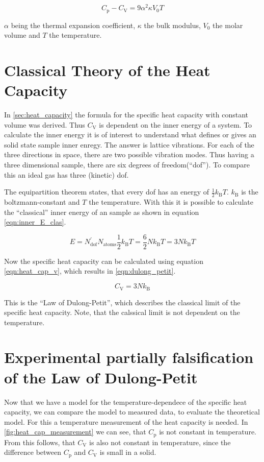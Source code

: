 \begin{equation}
    \label{eqn:p_v_correction}
    C_\mathrm{p} - C_\mathrm{V} = 9\alpha^2\kappa V_0T
\end{equation}

$\alpha$ being the thermal expansion coefficient, $\kappa$ the bulk modulus, $V_0$ the molar volume and $T$ the temperature.

\section{Classical Theory of the Heat Capacity}
\label{sec:classical}
In \autoref{sec:heat_capacity} the formula for the specific heat capacity with constant volume was derived. Thus $C_\mathrm{V}$ is dependent on the inner energy of a system. To 
calculate the inner energy it is of interest to understand what defines or gives an solid state sample inner enregy. The answer is lattice vibrations. For each of the three directions
in space, there are two possible vibration modes. Thus having a three dimensional sample, there are six degrees of freedom(\enquote{dof}). To compare this an ideal gas has three (kinetic)
dof.

The equipartition theorem states, that every
dof has an energy of $\frac{1}{2}k_\mathrm{B}T$. $k_\mathrm{B}$ is the boltzmann-constant and $T$ the temperature. With this it is possible to calculate the \enquote{classical} inner
energy of an sample as shown in equation \ref{eqn:inner_E_clas}.

\begin{equation}
    \label{eqn:inner_E_clas}
    E = N_{\mathrm{dof}}^{'} N_{\mathrm{atoms}} \frac{1}{2}k_\mathrm{B}T = \frac{6}{2}Nk_\mathrm{B}T = 3Nk_\mathrm{B}T
\end{equation}

Now the specific heat capacity can be calculated using equation \ref{eqn:heat_cap_v}, which results in \ref{eqn:dulong_petit}.

\begin{equation}
    \label{eqn:dulong_petit}
    C_\mathrm{V} = 3Nk_\mathrm{B}
\end{equation}

This is the \enquote{Law of Dulong-Petit}, which describes the classical limit of the specific heat capacity. Note, that the calssical limit is not dependent on the temperature.

\section{Experimental partially falsification of the Law of Dulong-Petit}
\label{sec:ueberleitung}
Now that we have a model for the temperature-dependece of the specific heat capacity, we can compare the model to measured data, to evaluate the theoretical model. For this a temperature
measurement of the heat capacity is needed. In \autoref{fig:heat_cap_measurement} we can see, that $C_\mathrm{p}$ is not constant in temperature. From this follows, that $C_\mathrm{V}$
is also not constant in temperature, since the difference between $C_\mathrm{p}$ and $C_\mathrm{V}$ is small in a solid.

